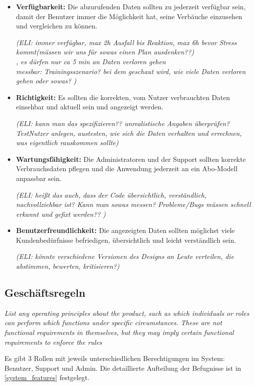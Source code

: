 
\begin{itemize}
    \item \textbf{Verfügbarkeit: }
    Die abzurufenden Daten sollten zu jederzeit verfügbar sein,
    damit der Benutzer immer die Möglichkeit hat, 
    seine Verbäuche einzusehen und vergleichen zu können.
    
    \textit{(ELI: immer verfügbar, max 2h Ausfall bis Reaktion, 
    max 6h bevor Stress kommt(müssen wir uns für sowas einen Plan ausdenken??)\\,
    es dürfen nur ca 5 min an Daten verloren gehen\\
    messbar: Trainingsszenario? bei dem geschaut wird, 
    wie viele Daten verloren gehen oder sowas? )}
    
    \item \textbf{Richtigkeit: }
    Es sollten die korrekten, 
    vom Nutzer verbrauchten Daten einsehbar und 
    aktuell sein und angezeigt werden.

\textit{(ELI: kann man das spezifizieren?? unrealistische Angaben überprüfen?
\\TestNutzer anlegen, austesten, 
    wie sich die Daten verhalten und errechnen, 
    was eigentlich rauskommen sollte)}
    \item \textbf{Wartungsfähigkeit: }
    Die Administratoren und der Support sollten korrekte Verbrauchsdaten 
    pflegen und die Anwendung jederzeit an ein Abo-Modell anpassbar sein.

    \textit{(ELI: heißt das auch, dass der Code übersichtlich, verständlich, 
    nachvollziehbar ist? Kann man sowas messen?
    Probleme/Bugs müssen schnell erkannt und gefixt werden?? )}

    \item \textbf{Benutzerfreundlichkeit: }
    Die angezeigten Daten sollten möglichst viele Kundenbedürfnisse 
    befriedigen, übersichtlich und leicht verständlich sein.

    \textit{(ELI: könnte verschiedene Versionen des Designs an 
    Leute verteilen, die abstimmen, bewerten, kritisieren?)}
\end{itemize}

\subsection{Geschäftsregeln}
\textit{List any operating principles about the product, 
such as which individuals or roles can perform which functions under specific circumstances. 
These are not functional requirements in themselves, 
but they may imply certain functional requirements to enforce the rules}

    Es gibt 3 Rollen mit jeweils unterschiedlichen Berechtigungen im System: Benutzer, Support und Admin. Die detaillierte Aufteilung der Befugnisse ist in \ref{system_features} festgelegt.
